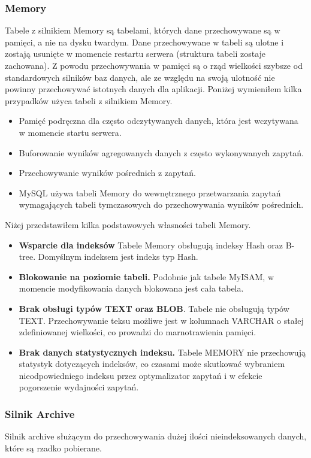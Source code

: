 \subsubsection{Memory}
Tabele z silnikiem Memory są tabelami, których dane przechowywane są w pamięci, a nie na dysku twardym. Dane przechowywane w tabeli są ulotne i zostają usunięte w momencie restartu serwera (struktura tabeli zostaje zachowana). Z powodu przechowywania w pamięci są o rząd wielkości szybsze od standardowych silników baz danych, ale ze względu na swoją ulotność nie powinny przechowywać istotnych danych dla aplikacji. Poniżej wymieniłem kilka przypadków użyca tabeli z silnikiem Memory. 
\begin{itemize}
	\item Pamięć podręczna dla często odczytywanych danych, która jest wczytywana w momencie startu serwera.
	\item Buforowanie wyników agregowanych danych z często wykonywanych zapytań.
	\item Przechowywanie wyników pośrednich z zapytań.
	\item MySQL używa tabeli Memory do wewnętrznego przetwarzania zapytań wymagających tabeli tymczasowych do przechowywania wyników pośrednich.
\end{itemize}
Niżej przedstawiłem kilka podstawowych własności tabeli Memory.
\begin{itemize}
	\item \textbf{Wsparcie dla indeksów} Tabele Memory obsługują indeksy Hash oraz B-tree. Domyślnym indeksem jest indeks typ Hash.
	\item \textbf{Blokowanie na poziomie tabeli.} Podobnie jak tabele MyISAM, w momencie modyfikowania danych blokowana jest cała tabela.
	\item \textbf{Brak obsługi typów TEXT oraz BLOB}. Tabele nie obsługują typów TEXT. Przechowywanie teksu możliwe jest w kolumnach VARCHAR o stałej zdefiniowanej wielkości, co prowadzi do marnotrawienia pamięci.
	\item \textbf{Brak danych statystycznych indeksu.} Tabele MEMORY nie przechowują statystyk dotyczących indeksów, co czasami może skutkować wybraniem nieodpowiedniego indeksu przez optymalizator zapytań i w efekcie pogorszenie wydajności zapytań.
\end{itemize}


\subsubsection{Silnik Archive}
Silnik archive służącym do przechowywania dużej ilości nieindeksowanych danych, które są rzadko pobierane. 

